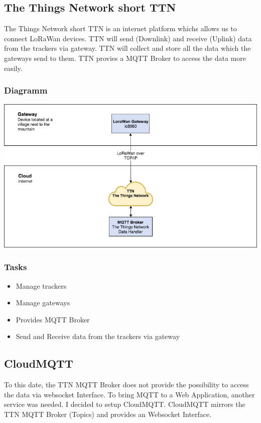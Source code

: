 \documentclass[a4paper,11pt, oneside]{report}
\theoremstyle{definition}
\begin{document}
\subsection{The Things Network short TTN}
The Things Network short TTN is an internet platform whichs allows us to connect LoRaWan devices. TTN will send (Downlink) and receive (Uplink) data from the trackers via gateway. TTN will collect and store all the data which the gateways send to them. TTN provies a MQTT Broker to access the data more easily.

\subsubsection{Diagramm}
\includegraphics[width=\textwidth]{img/ATAS_SystemOverview_Detail_TTN.png}

\subsubsection{Tasks}
\begin{itemize}
\item Manage trackers
\item Manage gateways
\item Provides MQTT Broker
\item Send and Receive data from the trackers via gateway
\end{itemize}

\newpage
\subsection{CloudMQTT}
To this date, the TTN MQTT Broker does not provide the possibility to access the data via websocket Interface. To bring MQTT to a  Web Application, another service was needed. I decided to setup CloudMQTT. CloudMQTT mirrors the TTN MQTT Broker (Topics) and provides an Websocket Interface.
\end{document}
